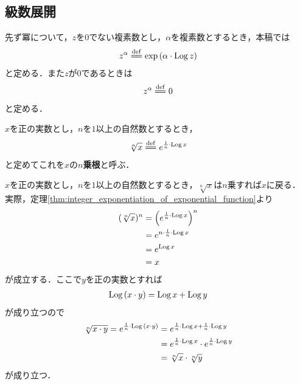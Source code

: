 \subsection{級数展開}
	
	先ず冪について，$z$を$0$でない複素数とし，$\alpha$を複素数とするとき，本稿では
	\begin{align}
		z^{\alpha} \defeq \exp{(\alpha \cdot \pvlog{z})}
	\end{align}
	と定める．また$z$が$0$であるときは
	\begin{align}
		z^{\alpha} \defeq 0
	\end{align}
	と定める．
	
	\begin{screen}
		\begin{dfn}[冪根]
			$x$を正の実数とし，$n$を$1$以上の自然数とするとき，
			\begin{align}
				\sqrt[n]{x} \defeq e^{\frac{1}{n} \cdot \pvlog{x}}
			\end{align}
			と定めてこれを$x$の{\bf $n$乗根}と呼ぶ．
		\end{dfn}
	\end{screen}
	
	$x$を正の実数とし，$n$を$1$以上の自然数とするとき，$\sqrt[n]{x}$は$n$乗すれば$x$に戻る．
	実際，定理\ref{thm:integer_exponentiation_of_exponential_function}より
	\begin{align}
		(\sqrt[n]{x})^{n} &= \left(e^{\frac{1}{n} \cdot \operatorname{Log}{x}}\right)^{n} \\
		&= e^{n \cdot \frac{1}{n} \cdot \operatorname{Log}{x}} \\
		&= e^{\operatorname{Log}{x}} \\
		&= x
	\end{align}
	が成立する．ここで$y$を正の実数とすれば
	\begin{align}
		\operatorname{Log}{(x \cdot y)} = \operatorname{Log}{x} + \operatorname{Log}{y}
	\end{align}
	が成り立つので
	\begin{align}
		\sqrt[n]{x \cdot y} = e^{\frac{1}{n} \cdot \operatorname{Log}{(x \cdot y)}}
		&= e^{\frac{1}{n} \cdot \operatorname{Log}{x} + \frac{1}{n} \cdot \operatorname{Log}{y}} \\
		&= e^{\frac{1}{n} \cdot \operatorname{Log}{x}} \cdot e^{\frac{1}{n} \cdot \operatorname{Log}{y}} \\
		&= \sqrt[n]{x} \cdot \sqrt[n]{y}
	\end{align}
	が成り立つ．
	
